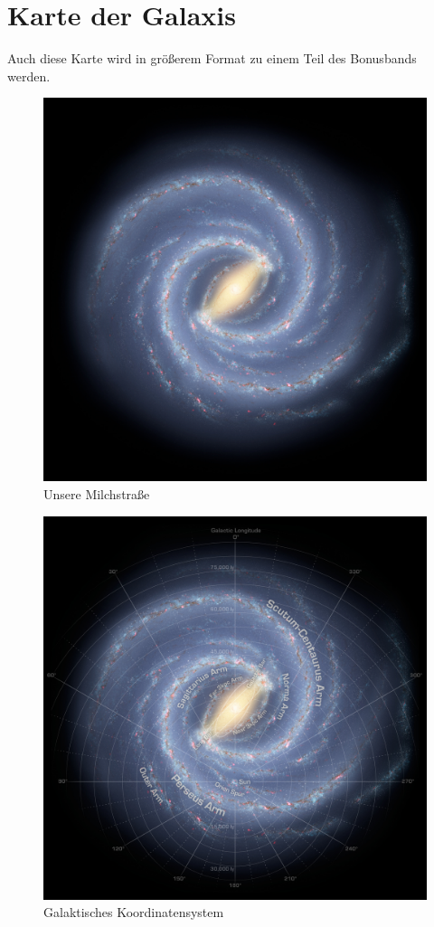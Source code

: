\chapter{Karte der Galaxis}

Auch diese Karte wird in größerem Format zu einem Teil des Bonusbands werden.

\begin{figure}[p]
	\includegraphics[width=\linewidth]{include-main-galaxymap-square-bg.jpg}
	\caption{Unsere Milchstraße}
\end{figure}

\begin{figure}[p]
	\includegraphics[width=\linewidth]{include-main-galaxymap-square.jpg}
	\caption{Galaktisches Koordinatensystem}
\end{figure}


